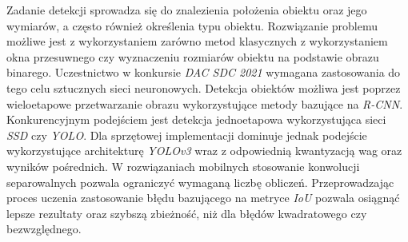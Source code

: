 Zadanie detekcji sprowadza się do znalezienia położenia obiektu oraz jego wymiarów, a często również określenia typu obiektu. 
Rozwiązanie problemu możliwe jest z wykorzystaniem zarówno metod klasycznych z wykorzystaniem okna przesuwnego czy wyznaczeniu rozmiarów obiektu na podstawie obrazu binarego.
Uczestnictwo w konkursie \emph{DAC SDC 2021} wymagana zastosowania do tego celu sztucznych sieci neuronowych.
Detekcja obiektów możliwa jest poprzez wieloetapowe przetwarzanie obrazu wykorzystujące metody bazujące na \emph{R-CNN}. 
Konkurencyjnym podejściem jest detekcja jednoetapowa wykorzystująca sieci \emph{SSD} czy \emph{YOLO}.
Dla sprzętowej implementacji dominuje jednak podejście wykorzystujące architekturę \emph{YOLOv3} wraz z odpowiednią kwantyzacją wag oraz wyników pośrednich.
W rozwiązaniach mobilnych stosowanie konwolucji separowalnych pozwala ograniczyć wymaganą liczbę obliczeń.
Przeprowadzając proces uczenia zastosowanie błędu bazującego na metryce \emph{IoU} pozwala osiągnąć lepsze rezultaty oraz szybszą zbieżność, niż dla błędów kwadratowego czy bezwzględnego.




